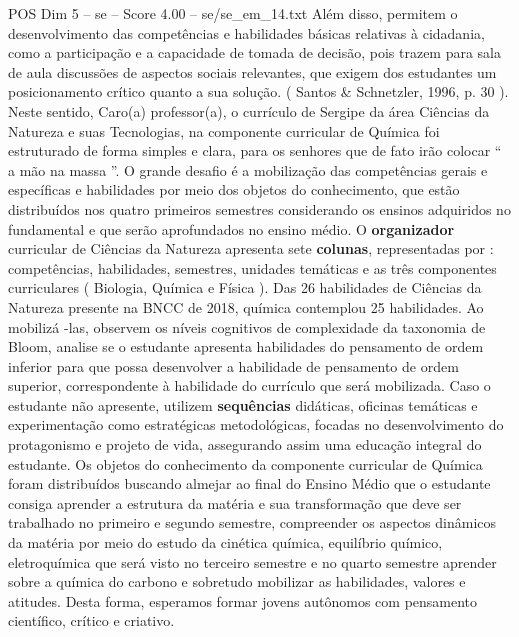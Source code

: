 \begin{textsample}{POS Dim 5 – se – Score 4.00 – se/se\_em\_14.txt}
Além disso, permitem o desenvolvimento das competências e habilidades básicas relativas à cidadania, como a participação e a capacidade de tomada de decisão, pois trazem para sala de aula discussões de aspectos sociais relevantes, que exigem dos estudantes um posicionamento crítico quanto a sua solução. ( Santos \& Schnetzler, 1996, p. 30 ).
Neste sentido, Caro(a) professor(a), o currículo de Sergipe da área Ciências da Natureza e suas Tecnologias, na componente curricular de Química foi estruturado de forma simples e clara, para os senhores que de fato irão colocar “ a mão na massa ”.
O grande desafio é a mobilização das competências gerais e específicas e habilidades por meio dos objetos do conhecimento, que estão distribuídos nos quatro primeiros semestres considerando os ensinos adquiridos no fundamental e que serão aprofundados no ensino médio.
O \textbf{organizador} curricular de Ciências da Natureza apresenta sete \textbf{colunas}, representadas por : competências, habilidades, semestres, unidades temáticas e as três componentes curriculares ( Biologia, Química e Física ).
Das 26 habilidades de Ciências da Natureza presente na BNCC de 2018, química contemplou 25 habilidades.
Ao mobilizá -las, observem os níveis cognitivos de complexidade da taxonomia de Bloom, analise se o estudante apresenta habilidades do pensamento de ordem inferior para que possa desenvolver a habilidade de pensamento de ordem superior, correspondente à habilidade do currículo que será mobilizada.
Caso o estudante não apresente, utilizem \textbf{sequências} didáticas, oficinas temáticas e experimentação como estratégicas metodológicas, focadas no desenvolvimento do protagonismo e projeto de vida, assegurando assim uma educação integral do estudante.
Os objetos do conhecimento da componente curricular de Química foram distribuídos buscando almejar ao final do Ensino Médio que o estudante consiga aprender a estrutura da matéria e sua transformação que deve ser trabalhado no primeiro e segundo semestre, compreender os aspectos dinâmicos da matéria por meio do estudo da cinética química, equilíbrio químico, eletroquímica que será visto no terceiro semestre e no quarto semestre aprender sobre a química do carbono e sobretudo mobilizar as habilidades, valores e atitudes.
Desta forma, esperamos formar jovens autônomos com pensamento científico, crítico e criativo.

\end{textsample}
